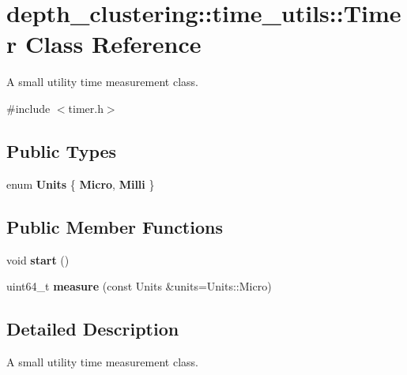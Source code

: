 \hypertarget{classdepth__clustering_1_1time__utils_1_1Timer}{}\section{depth\+\_\+clustering\+:\+:time\+\_\+utils\+:\+:Timer Class Reference}
\label{classdepth__clustering_1_1time__utils_1_1Timer}


A small utility time measurement class.  




{\ttfamily \#include $<$timer.\+h$>$}

\subsection*{Public Types}
\begin{DoxyCompactItemize}
\item 
\mbox{\label{classdepth__clustering_1_1time__utils_1_1Timer_a05315174b87812e3b2b50c372c9aa041}} 
enum {\bfseries Units} \{ {\bfseries Micro}, 
{\bfseries Milli}
 \}
\end{DoxyCompactItemize}
\subsection*{Public Member Functions}
\begin{DoxyCompactItemize}
\item 
\mbox{\label{classdepth__clustering_1_1time__utils_1_1Timer_a427c133e6773d0dc3c83cbdb9fceaf48}} 
void {\bfseries start} ()
\item 
\mbox{\label{classdepth__clustering_1_1time__utils_1_1Timer_a5d90ccad61e49c2dde4320c4df8d04f0}} 
uint64\+\_\+t {\bfseries measure} (const Units \&units=Units\+::\+Micro)
\end{DoxyCompactItemize}


\subsection{Detailed Description}
A small utility time measurement class. 

